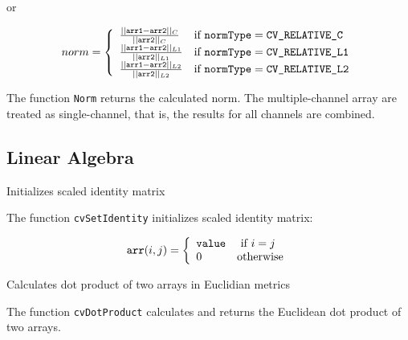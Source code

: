 or

\[
norm = \left\{ \begin{array}{l l} \frac{||\texttt{arr1}-\texttt{arr2}||_C    }{||\texttt{arr2}||_C   } & \mbox{if $\texttt{normType} = \texttt{CV\_RELATIVE\_C}$}\\ \frac{||\texttt{arr1}-\texttt{arr2}||_{L1} }{||\texttt{arr2}||_{L1}} & \mbox{if $\texttt{normType} = \texttt{CV\_RELATIVE\_L1}$}\\ \frac{||\texttt{arr1}-\texttt{arr2}||_{L2} }{||\texttt{arr2}||_{L2}} & \mbox{if $\texttt{normType} = \texttt{CV\_RELATIVE\_L2}$}\\ \end{array} \right.
\]

The function \texttt{Norm} returns the calculated norm. The multiple-channel array are treated as single-channel, that is, the results for all channels are combined.


\subsection{Linear Algebra}

\label{SetIdentity}

Initializes scaled identity matrix


\begin{description}
\end{description}

The function \texttt{cvSetIdentity} initializes scaled identity matrix:

\[
\texttt{arr}(i,j)=\left\{ \begin{array}{l l} \texttt{value} & \mbox{ if $i=j$}\\ 0 & \mbox{otherwise}\\ \end{array} \right.
\]

\label{DotProduct}

Calculates dot product of two arrays in Euclidian metrics


\begin{description}
\end{description}

The function \texttt{cvDotProduct} calculates and returns the Euclidean dot product of two arrays.


